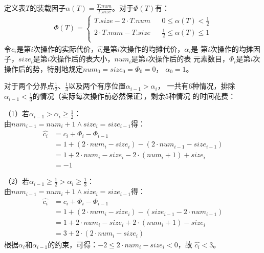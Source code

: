 \begin{solution}
    定义表$T$的装载因子$\alpha(T)=\frac{T.num}{T.size}$。对于$\Phi(T)$有：
    \begin{align*}
        \Phi(T)=\left\{
        \begin{array}{rcl}
        T.size - 2\cdot T.num & & {0 \le \alpha(T) < \frac{1}{2}}\\
        2\cdot T.num - T.size & & {\frac{1}{2} \le \alpha(T) \le 1}\\
        \end{array} \right.
    \end{align*}
    令$c_i$是第$i$次操作的实际代价，$\hat{c_i}$是第$i$次操作的均摊代价，$\alpha_i$是
    第$i$次操作的均摊因子，$size_i$是第$i$次操作后的表大小，$num_i$是第$i$次操作后的表
    元素数目，$\Phi_i$是第$i$次操作后的势，特别地规定$num_0 = size_0 = \Phi_0 = 0$，
    $\alpha_0 = 1$。

    对于两个分界点$\frac{1}{2}$、$\frac{1}{3}$以及两个有序位置$\alpha_{i-1} > \alpha_i$，
    一共有6种情况，排除$\alpha_{i-1}<\frac{1}{3}$的情况（实际每次操作前必然保证），剩余5种情况
    的时间花费：

    （1）若$\alpha_{i-1} > \alpha_i \ge \frac{1}{2}$：\\
    由$num_{i-1}=num_i+1 \wedge size_i = size_{i-1}$得：
    \begin{align*}
        \hat{c_i} &= c_i + \Phi_i - \Phi_{i-1}\\
        &= 1 + (2\cdot num_{i}-size_{i}) - (2 \cdot num_{i-1}-size_{i-1})\\
        &= 1 + 2\cdot num_i -size_i - 2\cdot(num_i + 1) + size_i\\
        &= -1
    \end{align*}

    （2）若$\alpha_{i-1} \ge \frac{1}{2} > \alpha_i \ge \frac{1}{3}$：\\
    由$num_{i-1}=num_i+1 \wedge size_i = size_{i-1}$得：
    \begin{align*}
        \hat{c_i} &= c_i + \Phi_i - \Phi_{i-1}\\
        &= 1 + (2\cdot num_{i} - size_{i}) - (size_{i-1} - 2 \cdot num_{i-1})\\
        &= 1 + 2\cdot num_i - size_i + 2\cdot(num_i + 1) - size_i\\
        &= 3 + 2\cdot (2\cdot num_i - size_i)
    \end{align*}
    根据$\alpha_i$和$\alpha_{i-1}$的约束，可得：$-2 \le 2\cdot num_i - size_i < 0$，故
    $\hat{c_i}<3$。


\end{solution}
